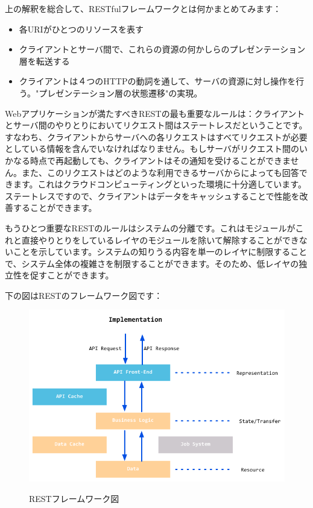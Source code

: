 上の解釈を総合して、RESTfulフレームワークとは何かまとめてみます：

\begin{itemize}
  \item 各URIがひとつのリソースを表す
  \item クライアントとサーバ間で、これらの資源の何かしらのプレゼンテーション層を転送する
  \item クライアントは４つのHTTPの動詞を通して、サーバの資源に対し操作を行う。"プレゼンテーション層の状態遷移"の実現。
\end{itemize}

Webアプリケーションが満たすべきRESTの最も重要なルールは：クライアントとサーバ間のやりとりにおいてリクエスト間はステートレスだということです。すなわち、クライアントからサーバへの各リクエストはすべてリクエストが必要としている情報を含んでいなければなりません。もしサーバがリクエスト間のいかなる時点で再起動しても、クライアントはその通知を受けることができません。また、このリクエストはどのような利用できるサーバからによっても回答できます。これはクラウドコンピューティングといった環境に十分適しています。ステートレスですので、クライアントはデータをキャッシュすることで性能を改善することができます。

もうひとつ重要なRESTのルールはシステムの分離です。これはモジュールがこれと直接やりとりをしているレイヤのモジュールを除いて解除することができないことを示しています。システムの知りうる内容を単一のレイヤに制限することで、システム全体の複雑さを制限することができます。そのため、低レイヤの独立性を促すことができます。

下の図はRESTのフレームワーク図です：

\begin{figure}[H]
   \includegraphics[width=14cm]{8.3.rest2.png}
   \label{図8.5}
   \caption{RESTフレームワーク図}
\end{figure}

